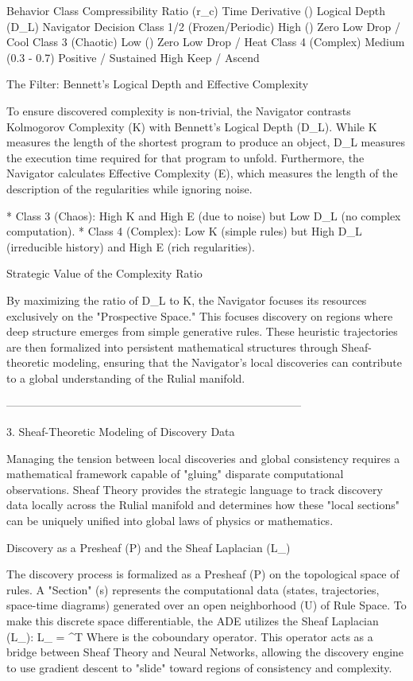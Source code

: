 Behavior Class	Compressibility Ratio (r_c)	Time Derivative ()	Logical Depth (D_L)	Navigator Decision
Class 1/2 (Frozen/Periodic)	High ()	Zero	Low	Drop / Cool
Class 3 (Chaotic)	Low ()	Zero	Low	Drop / Heat
Class 4 (Complex)	Medium (0.3 - 0.7)	Positive / Sustained	High	Keep / Ascend

The Filter: Bennett’s Logical Depth and Effective Complexity

To ensure discovered complexity is non-trivial, the Navigator contrasts Kolmogorov Complexity (K) with Bennett’s Logical Depth (D_L). While K measures the length of the shortest program to produce an object, D_L measures the execution time required for that program to unfold. Furthermore, the Navigator calculates Effective Complexity (E), which measures the length of the description of the regularities while ignoring noise.

* Class 3 (Chaos): High K and High E (due to noise) but Low D_L (no complex computation).
* Class 4 (Complex): Low K (simple rules) but High D_L (irreducible history) and High E (rich regularities).

Strategic Value of the Complexity Ratio

By maximizing the ratio of D_L to K, the Navigator focuses its resources exclusively on the "Prospective Space." This focuses discovery on regions where deep structure emerges from simple generative rules. These heuristic trajectories are then formalized into persistent mathematical structures through Sheaf-theoretic modeling, ensuring that the Navigator’s local discoveries can contribute to a global understanding of the Rulial manifold.


--------------------------------------------------------------------------------


3. Sheaf-Theoretic Modeling of Discovery Data

Managing the tension between local discoveries and global consistency requires a mathematical framework capable of "gluing" disparate computational observations. Sheaf Theory provides the strategic language to track discovery data locally across the Rulial manifold and determines how these "local sections" can be uniquely unified into global laws of physics or mathematics.

Discovery as a Presheaf (P) and the Sheaf Laplacian (L_)

The discovery process is formalized as a Presheaf (P) on the topological space of rules. A "Section" (s) represents the computational data (states, trajectories, space-time diagrams) generated over an open neighborhood (U) of Rule Space. To make this discrete space differentiable, the ADE utilizes the Sheaf Laplacian (L_): L_ = \delta^T \delta Where \delta is the coboundary operator. This operator acts as a bridge between Sheaf Theory and Neural Networks, allowing the discovery engine to use gradient descent to "slide" toward regions of consistency and complexity.

